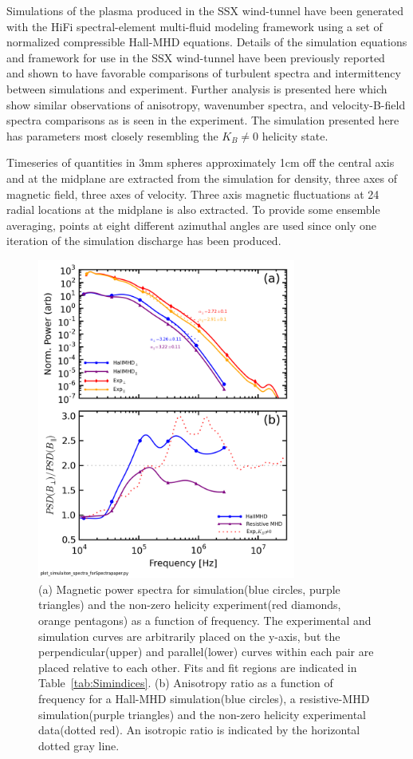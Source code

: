 \documentclass[aip,prl,amsmath,amssymb,reprint,superscriptaddress]{revtex4-1} %
\begin{document}
Simulations of the plasma produced in the SSX wind-tunnel have been generated with the HiFi spectral-element multi-fluid modeling framework using a set of normalized compressible Hall-MHD equations. Details of the simulation equations and framework for use in the SSX wind-tunnel have been previously reported~\cite{schaffner14a} and shown to have favorable comparisons of turbulent spectra and intermittency between simulations and experiment. Further analysis is presented here which show similar observations of anisotropy, wavenumber spectra, and velocity-B-field spectra comparisons as is seen in the experiment. The simulation presented here has parameters most closely resembling the $K_{B}\neq 0$ helicity state. 

Timeseries of quantities in 3mm spheres approximately 1cm off the central axis and at the midplane are extracted from the simulation for density, three axes of magnetic field, three axes of velocity. Three axis magnetic fluctuations at 24 radial locations at the midplane is also extracted. To provide some ensemble averaging, points at eight different azimuthal angles are used since only one iteration of the simulation discharge has been produced.

\begin{figure}[!htbp]
\centerline{
\includegraphics[width=8.5cm]{Anisotropy_simulation_comparison}}
\caption{\label{fig:aniso_comp} (a) Magnetic power spectra for simulation(blue circles, purple triangles) and the non-zero helicity experiment(red diamonds, orange pentagons) as a function of frequency. The experimental and simulation curves are arbitrarily placed on the y-axis, but the perpendicular(upper) and parallel(lower) curves within each pair are placed relative to each other. Fits and fit regions are indicated in Table~\ref{tab:Simindices}. (b) Anisotropy ratio as a function of frequency for a Hall-MHD simulation(blue circles), a resistive-MHD simulation(purple triangles) and the non-zero helicity experimental data(dotted red). An isotropic ratio is indicated by the horizontal dotted gray line.}
\end{figure}
\end{document}
